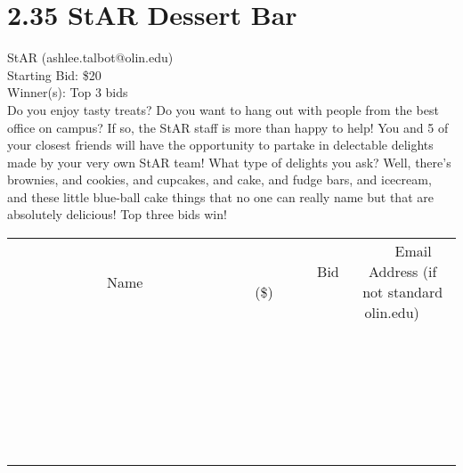 \documentclass[11pt]{article}
\begin{document}
\section*{2.35 StAR Dessert Bar}
StAR (ashlee.talbot@olin.edu) \\
Starting Bid: \$20 \\
Winner(s): 
Top 3 bids \\
Do you enjoy tasty treats? Do you want to hang out with people from the best office on campus?  If so, the StAR staff is more than happy to help! You and 5 of your closest friends will have the opportunity to partake in delectable delights made by your very own StAR team! What type of delights you ask? Well, there's brownies, and cookies, and cupcakes, and cake, and fudge bars, and icecream, and these little blue-ball cake things that no one can really name but that are absolutely delicious! Top three bids win! \\[6ex]
\begin{tabular}{c c c}
~~~~~~~~~~~~~Name~~~~~~~~~~~~~ & ~~~~~~~~~Bid (\$)~~~~~~~~~ & ~~~Email Address (if not standard olin.edu)~~~ \\
 & & \\
\hline
 & & \\
\hline
 & & \\
\hline
 & & \\
\hline
 & & \\
\hline
 & & \\
\hline
 & & \\
\hline
 & & \\
\hline
 & & \\
\hline
 & & \\
\hline
 & & \\
\hline
 & & \\
\hline
 & & \\
\hline
 & & \\
\hline
 & & \\
\hline
 & & \\
\hline
 & & \\
\hline
 & & \\
\hline
 & & \\
\hline
 & & \\
\hline
 & & \\
\hline
 & & \\
\hline
 & & \\
\hline
 & & \\
\hline
 & & \\
\hline
 & & \\
\hline
\end{tabular}
\clearpage
\end{document}
